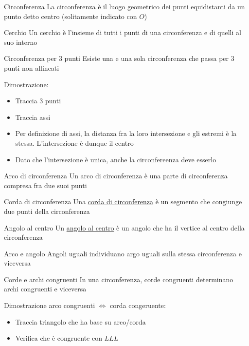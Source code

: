 \begin{definizione}{Circonferenza}
	La circonferenza è il luogo geometrico dei punti equidistanti da un punto detto centro (solitamente indicato con $ O $)
\end{definizione}
\begin{definizione}{Cerchio}
	Un cerchio è l'insieme di tutti i punti di una circonferenza e di quelli al suo interno
\end{definizione}

\begin{teorema}{Circonferenza per 3 punti}
	Esiste una e una sola circonferenza che passa per 3 punti non allineati
\end{teorema}
Dimostrazione:
\begin{itemize}
	\item Traccia 3 punti
	\item Traccia assi
	\item Per definizione di assi, la distanza fra la loro intersezione e gli estremi è la stessa. L'intersezione è dunque il centro
	\item Dato che l'intersezione è unica, anche la circonfereenza deve esserlo
\end{itemize}

\begin{definizione}{Arco di circonferenza}
	Un arco di circonferenza è una parte di circonferenza compresa fra due suoi punti
\end{definizione}
\begin{definizione}{Corda di circonferenza}
	Una \underline{corda di circonferenza} è un segmento che congiunge due punti della circonferenza
\end{definizione}
\begin{definizione}{Angolo al centro}
	Un \underline{angolo al centro} è un angolo che ha il vertice al centro della circonferenza
\end{definizione}

\begin{teorema}{Arco e angolo}
	Angoli uguali individuano argo uguali sulla stessa circonferenza e viceversa
\end{teorema}

\begin{teorema}{Corde e archi congruenti}
	In una circonferenza, corde congruenti determinano archi congruenti e viceversa
\end{teorema}

Dimostrazione arco congruenti $ \Leftrightarrow   $ corda congeruente:
\begin{itemize}
	\item Traccia triangolo che ha base su arco/corda
	\item Verifica che è congruente con $ LLL $
\end{itemize}

